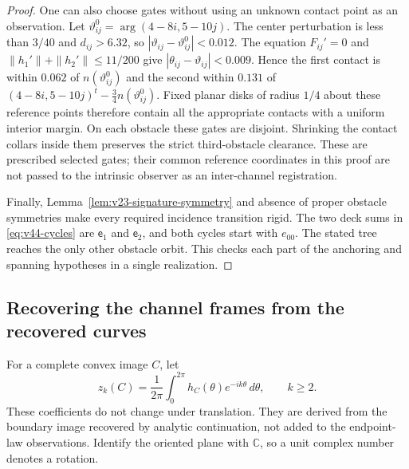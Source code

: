\begin{proof}
One can also choose gates without using an unknown contact point as an
observation.  Let $\vartheta_{ij}^0=\arg(4-8i,5-10j)$.  The center
perturbation is less than $3/40$ and $d_{ij}>6.32$, so
$|\vartheta_{ij}-\vartheta_{ij}^0|<0.012$.
The equation $F_{ij}'=0$ and
$\|h_1'\|+\|h_2'\|\le11/200$ give
$|\theta_{ij}-\vartheta_{ij}|<0.009$.  Hence the first contact is
within $0.062$ of $n(\vartheta_{ij}^0)$ and the second within $0.131$
of $(4-8i,5-10j)^t-\tfrac34 n(\vartheta_{ij}^0)$.
Fixed planar disks of radius $1/4$ about these reference points therefore
contain all the appropriate contacts with a uniform interior margin.
On each obstacle these gates are disjoint.  Shrinking the contact collars
inside them preserves the strict third-obstacle clearance.  These are
prescribed selected gates; their common reference coordinates in this
proof are not passed to the intrinsic observer as an inter-channel
registration.

Finally, Lemma~\ref{lem:v23-signature-symmetry} and absence of proper
obstacle symmetries make every required incidence transition rigid.
The two deck sums in \eqref{eq:v44-cycles} are $\mathsf e_1$ and
$\mathsf e_2$, and both cycles start with $e_{00}$.  The stated tree
reaches the only other obstacle orbit.  This checks each part of the
anchoring and spanning hypotheses in a single realization.
\end{proof}

\subsection{Recovering the channel frames from the recovered curves}

For a complete convex image $C$, let
\[
 z_k(C)=\frac1{2\pi}\int_0^{2\pi}h_C(\theta)e^{-ik\theta}\,d\theta,
 \qquad k\ge2.
\]
These coefficients do not change under translation.  They are derived
from the boundary image recovered by analytic continuation, not added
to the endpoint-law observations.  Identify the oriented plane with
$\mathbb C$, so a unit complex number denotes a rotation.

